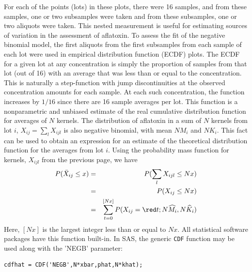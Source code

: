 \documentclass{article}
\def\bfl{\begin{lstlisting}[basicstyle=\footnotesize\ttfamily, keywordstyle=\footnotesize\ttfamily,showspaces=FALSE,showstringspaces=FALSE]}
\begin{document}
\begin{center}
\end{center}
\newpage
For each of the points (lots) in these plots, there were 16 samples, and from these samples, one 
or two subsamples were taken and from these subsamples, one or two aliquots were taken.  This 
nested measurement is useful for estimating sources of variation in the assessment of aflatoxin.
To assess the fit of the negative binomial model, the first aliquots from the first subsamples
from each sample of each lot were used in empirical distribution function (ECDF) plots.  The
ECDF for a given lot at any concentration is simply the proportion of samples from
that lot (out of 16) with an average that was less than or equal to the concentration.  This is naturally
a step-function with jump discontinuities at the observed concentration amounts for each sample.
At each such concentration, the function increases by $1/16$ since there are 16 sample averages
per lot.  
This function is a nonparametric and unbiased estimate of the real cumulative distribution function
for averages of $N$ kernels.  The distribution of aflatoxin in a sum of $N$ kernels from lot $i$, 
$X_{ij}=\sum_l X_{ijl}$ is also negative binomial, with mean $N M_i$ and $N K_i$.  This fact can be
used to obtain an expression for an estimate of the theoretical distribution function for the
averages from lot $i$.
Using the probability mass function for kernels, $X_{ijl}$ from
the previous page, we have
\begin{eqnarray*}
 P(\bar{X}_{ij} \leq x) &=& P(\sum_l X_{ijl} \leq N x) \\
  &=& P(X_{ij} \leq N x) \\
%&=& \sum_{t=0}^{[Nx]} P(X_{ij}=x;N\widehat{M}_i,N\widehat{K}_i) 
&=& \sum_{t=0}^{[Nx]} P(X_{ij}={\red t};N\widehat{M}_i,N\widehat{K}_i) 
\end{eqnarray*}
Here, $[Nx]$ is the largest integer less than or equal to $Nx$.
%Plots in which the estimated negative binomial cumulative distribution function are
%overlaid with the ECDF for the 20 lots are given below: \\
All statistical software packages have this function built-in.  In SAS, the generic {\tt CDF} function
may be used along with the 'NEGB' parameter:
\bfl
cdfhat = CDF('NEGB',N*xbar,phat,N*khat);
\end{lstlisting} 

\end{document}
